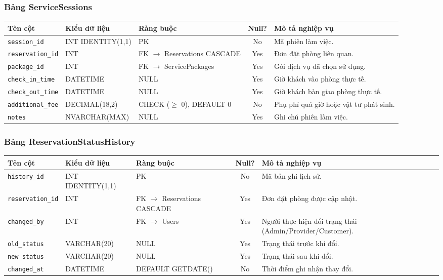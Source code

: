 \subsubsection{Bảng ServiceSessions}
\begin{table}[H]
\centering
\small
\begin{tabularx}{\textwidth}{l l l c X}
\toprule
\textbf{Tên cột} & \textbf{Kiểu dữ liệu} & \textbf{Ràng buộc} & \textbf{Null?} & \textbf{Mô tả nghiệp vụ} \\
\midrule
\texttt{session\_id} & INT IDENTITY(1,1) & PK & No & Mã phiên làm việc. \\
\texttt{reservation\_id}& INT & FK $\rightarrow$ Reservations CASCADE & Yes & Đơn đặt phòng liên quan. \\
\texttt{package\_id} & INT & FK $\rightarrow$ ServicePackages & Yes & Gói dịch vụ đã chọn sử dụng. \\
\texttt{check\_in\_time}& DATETIME & NULL & Yes & Giờ khách vào phòng thực tế. \\
\texttt{check\_out\_time}& DATETIME & NULL & Yes & Giờ khách bàn giao phòng thực tế. \\
\texttt{additional\_fee}& DECIMAL(18,2) & CHECK ($\ge$ 0), DEFAULT 0 & No & Phụ phí quá giờ hoặc vật tư phát sinh. \\
\texttt{notes} & NVARCHAR(MAX) & NULL & Yes & Ghi chú phiên làm việc. \\
\bottomrule
\end{tabularx}
\end{table}

\subsubsection{Bảng ReservationStatusHistory}
\begin{table}[H]
\centering
\small
\begin{tabularx}{\textwidth}{l l l c X}
\toprule
\textbf{Tên cột} & \textbf{Kiểu dữ liệu} & \textbf{Ràng buộc} & \textbf{Null?} & \textbf{Mô tả nghiệp vụ} \\
\midrule
\texttt{history\_id} & INT IDENTITY(1,1) & PK & No & Mã bản ghi lịch sử. \\
\texttt{reservation\_id}& INT & FK $\rightarrow$ Reservations CASCADE & Yes & Đơn đặt phòng được cập nhật. \\
\texttt{changed\_by} & INT & FK $\rightarrow$ Users & Yes & Người thực hiện đổi trạng thái (Admin/Provider/Customer). \\
\texttt{old\_status} & VARCHAR(20) & NULL & Yes & Trạng thái trước khi đổi. \\
\texttt{new\_status} & VARCHAR(20) & NULL & Yes & Trạng thái sau khi đổi. \\
\texttt{changed\_at} & DATETIME & DEFAULT GETDATE() & No & Thời điểm ghi nhận thay đổi. \\
\bottomrule
\end{tabularx}
\end{table}

